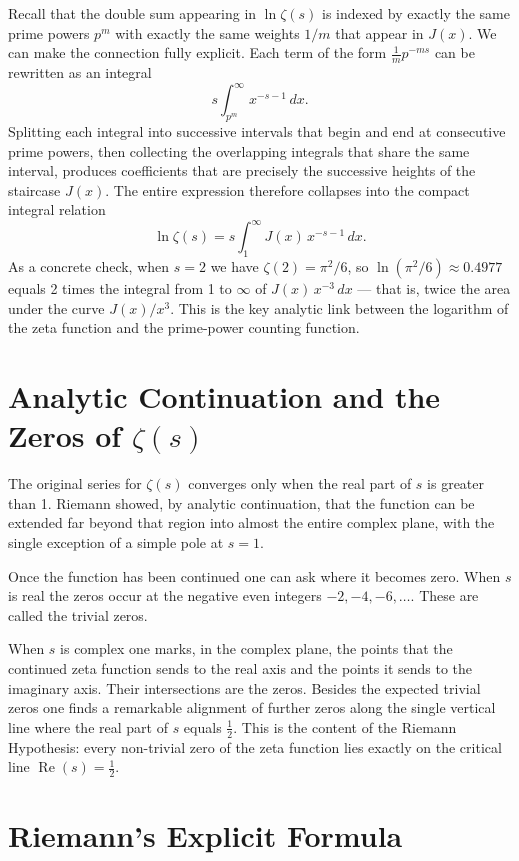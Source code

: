 \documentclass[11pt]{article}
\begin{document}
Recall that the double sum appearing in $\ln \zeta(s)$ is indexed by exactly the same prime powers $p^m$ with exactly the same weights $1/m$ that appear in $J(x)$. We can make the connection fully explicit. Each term of the form $\tfrac{1}{m} p^{-ms}$ can be rewritten as an integral
\[
s \int_{p^m}^{\infty} x^{-s-1}\, dx.
\]
Splitting each integral into successive intervals that begin and end at consecutive prime powers, then collecting the overlapping integrals that share the same interval, produces coefficients that are precisely the successive heights of the staircase $J(x)$. The entire expression therefore collapses into the compact integral relation
\[
\ln \zeta(s) = s \int_{1}^{\infty} J(x)\, x^{-s-1}\, dx.
\]
As a concrete check, when $s = 2$ we have $\zeta(2) = \pi^2/6$, so $\ln(\pi^2/6) \approx 0.4977$ equals 2 times the integral from 1 to $\infty$ of $J(x)\,x^{-3}\,dx$ --- that is, twice the area under the curve $J(x)/x^3$. This is the key analytic link between the logarithm of the zeta function and the prime-power counting function.

\section{Analytic Continuation and the Zeros of $\zeta(s)$}

The original series for $\zeta(s)$ converges only when the real part of $s$ is greater than 1. Riemann showed, by analytic continuation, that the function can be extended far beyond that region into almost the entire complex plane, with the single exception of a simple pole at $s = 1$.

Once the function has been continued one can ask where it becomes zero. When $s$ is real the zeros occur at the negative even integers $-2, -4, -6, \ldots$. These are called the trivial zeros.

When $s$ is complex one marks, in the complex plane, the points that the continued zeta function sends to the real axis and the points it sends to the imaginary axis. Their intersections are the zeros. Besides the expected trivial zeros one finds a remarkable alignment of further zeros along the single vertical line where the real part of $s$ equals $\tfrac{1}{2}$. This is the content of the Riemann Hypothesis: every non-trivial zero of the zeta function lies exactly on the critical line $\operatorname{Re}(s) = \tfrac{1}{2}$.

\section{Riemann's Explicit Formula}
\end{document}
